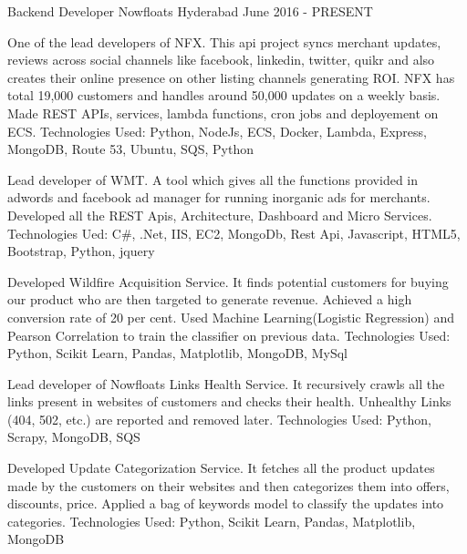 
\begin{cventries}

  \cventry
    {Backend Developer} %
    {Nowfloats} %
    {Hyderabad} %
    {June 2016 - PRESENT} %
    {
      \begin{cvitems} %
        \item {One of the lead developers of NFX. This api project syncs merchant updates, reviews across social channels like facebook, linkedin, twitter, quikr and also creates their online presence on other listing channels generating ROI. NFX has total 19,000 customers and handles around 50,000 updates on a weekly basis. Made REST APIs, services, lambda functions, cron jobs and deployement on ECS. Technologies Used: Python, NodeJs, ECS, Docker, Lambda, Express, MongoDB, Route 53, Ubuntu, SQS, Python}
        \item {Lead developer of WMT. A tool which gives all the functions provided in adwords and facebook ad manager for running inorganic ads for merchants. Developed all the REST Apis, Architecture, Dashboard and Micro Services. Technologies Ued: C\#, .Net, IIS, EC2, MongoDb, Rest Api, Javascript, HTML5, Bootstrap, Python, jquery}
        \item {Developed Wildfire Acquisition Service. It finds potential customers for buying our product who are then targeted to generate revenue. Achieved a high conversion rate of 20 per cent. Used Machine Learning(Logistic Regression) and Pearson Correlation to train the classifier on previous data. Technologies Used: Python, Scikit Learn, Pandas, Matplotlib, MongoDB, MySql  }
        \item {Lead developer of Nowfloats Links Health Service. It recursively crawls all the links present in websites of customers and checks their health. Unhealthy Links (404, 502, etc.) are reported and removed later. Technologies Used: Python, Scrapy, MongoDB, SQS  }
        \item {Developed Update Categorization Service. It fetches all the product updates made by the customers on their websites and then categorizes them into offers, discounts, price. Applied a bag of keywords model to classify the updates into categories. Technologies Used: Python, Scikit Learn, Pandas, Matplotlib, MongoDB  }
      \end{cvitems}
    }


\end{cventries}
